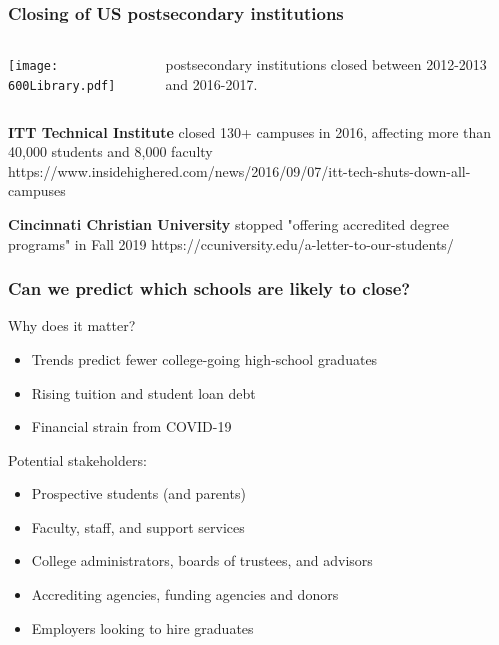\documentclass{beamer}
\begin{document}
\begin{frame}
\frametitle{Closing of US postsecondary institutions}

\begin{minipage}[0.5\textheight]{\textwidth}
\begin{columns}[T]
\begin{column}{0.65\textwidth}
\texttt{[image: 600Library.pdf]}
\end{column}
\begin{column}{0.35\textwidth}
\vspace{.7in}
postsecondary institutions closed between 2012-2013 and 2016-2017.
\end{column}
\end{columns}
\end{minipage}

\vspace{1.5em}

\textbf{ITT Technical Institute} closed 130+ campuses in 2016, affecting more than 40,000 students and 8,000 faculty \newline \tiny{https://www.insidehighered.com/news/2016/09/07/itt-tech-shuts-down-all-campuses}
\vspace{1.5em}

\normalsize \textbf{Cincinnati Christian University} stopped "offering accredited degree programs" in Fall 2019  \tiny{https://ccuniversity.edu/a-letter-to-our-students/}

\end{frame}
\begin{frame}
\frametitle{Can we predict which schools are likely to close?}

Why does it matter?
\begin{itemize}
\item Trends predict fewer college-going high-school graduates
\item Rising tuition and student loan debt
\item Financial strain from COVID-19
\end{itemize}

\vspace{1em}

Potential stakeholders:
\begin{itemize}
\item Prospective students (and parents)
\item Faculty, staff, and support services
\item College administrators, boards of trustees, and advisors
\item Accrediting agencies, funding agencies and donors
\item Employers looking to hire graduates
\end{itemize}
\end{frame}
\end{document}
